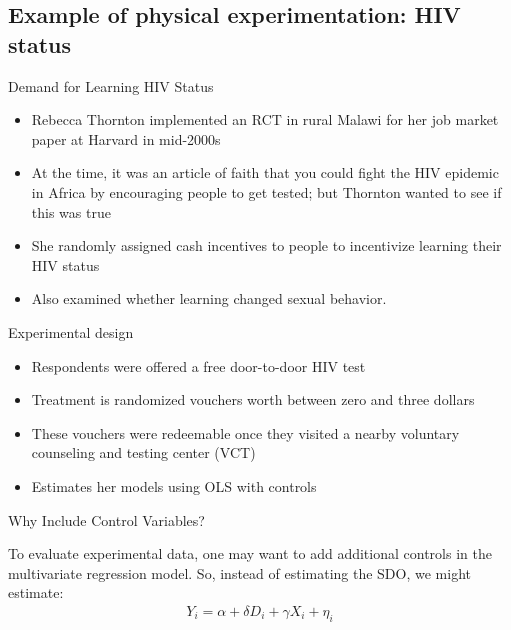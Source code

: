 \documentclass{beamer}
\begin{document}
\subsection{Example of physical experimentation: HIV status}

\begin{frame}{Demand for Learning HIV Status}


  \begin{itemize}
    \item Rebecca Thornton implemented an RCT in rural Malawi for her job market paper at Harvard in mid-2000s
    \item At the time, it was an article of faith that you could fight the HIV epidemic in Africa by encouraging people to get tested; but Thornton wanted to see if this was true
    \item She randomly assigned cash incentives to people to incentivize learning their HIV status
    \item Also examined whether learning changed sexual behavior.
  \end{itemize}

\end{frame}

\begin{frame}{Experimental design}

  \begin{itemize}
    \item Respondents were offered a free door-to-door HIV test
    \item Treatment is randomized vouchers worth between zero and three dollars
    \item These vouchers were redeemable once they visited a nearby voluntary counseling and testing center (VCT)
    \item Estimates her models using OLS with controls
  \end{itemize}

\end{frame}


\begin{frame}{Why Include Control Variables?}

  To evaluate experimental data, one may want to add additional controls in the multivariate regression model.  So, instead of estimating the SDO, we might estimate:
  \begin{eqnarray*}
    Y_i = \alpha + \delta D_i + \gamma X_i + \eta_i
  \end{eqnarray*}
\end{frame}
\end{document}
